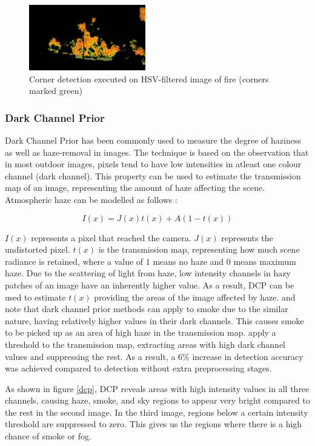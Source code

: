 \documentclass[lettersize,journal]{IEEEtran}
\begin{document}
\begin{figure}
        \centering
        \includegraphics[width=2in]{corner.png}
        \caption{Corner detection executed on HSV-filtered image of fire
        (corners marked green)}
        \label{corner}
\end{figure}

\subsubsection{Dark Channel Prior}

Dark Channel Prior has been commonly used to measure the degree of
haziness as well as haze-removal in images. The technique is based on
the observation that in most outdoor images, pixels tend to have low
intensities in atleast one colour channel (dark channel). This property
can be used to estimate the transmission map of an image, representing
the amount of haze affecting the scene. Atmospheric haze can be modelled
as follows \cite{darkchannelprior}:

\[I(x) = J(x)t(x) + A\left( 1 - t(x) \right)\]

\(I(x)\) represents a pixel that reached the camera. \(J(x)\) represents
the undistorted pixel. \(t(x)\) is the transmission map, representing
how much scene radiance is retained, where a value of 1 means no haze
and 0 means maximum haze. Due to the scattering of light from haze, low
intensity channels in hazy patches of an image have an inherently higher
value. As a result, DCP can be used to estimate \(t(x)\) providing the
areas of the image affected by haze. \cite{prepfire} and \cite{dcpsmoke}
note that dark channel prior methods can apply to smoke due to the
similar nature, having relatively higher values in their dark channels.
This causes smoke to be picked up as an area of high haze in the
transmission map. \cite{prepfire} apply a threshold to the transmission
map, extracting areas with high dark channel values and suppressing the
rest. As a result, a 6\% increase in detection accuracy was achieved
compared to detection without extra preprocessing stages.

As shown in figure \ref{dcp}, DCP reveals areas with high
intensity values in all three channels, causing haze, smoke, and sky
regions to appear very bright compared to the rest in the second image.
In the third image, regions below a certain intensity threshold are
suppressed to zero. This gives us the regions where there is a high
chance of smoke or fog.
\end{document}
